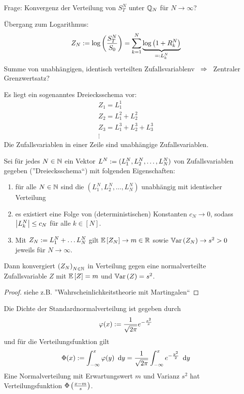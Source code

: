 Frage: Konvergenz der Verteilung von $S_T^N$ unter $\Q_N$ für $N \to \infty$?

Übergang zum Logarithmus:
\begin{equation*}
Z_N \defeq \log\brackets{\frac{S_T^N}{S_0}} = \sum_{k = 1}^N \underbrace{\log\brackets{1 + R_k^N}}_{\defqe L_k^N}
\end{equation*}
Summe von unabhängigen, identisch verteilten Zufallsvariablenv $\follows$ Zentraler Grenzwertsatz?

Es liegt ein sogenanntes Dreiecksschema vor:
\begin{align*}
Z_1 = L_1^1 \\
Z_2 = L_1^2 + L_2^2 \\
Z_3 = L_1^3 + L_2^3 + L_3^3 \\
\vdots
\end{align*}
Die Zufallsvariablen in einer Zeile sind unabhängige Zufallsvariablen.

\begin{theorem} %
	\label{theorem: 3.1}
	Sei für jedes $N \in \N$ ein Vektor $L^N \defeq (L_1^N, L_2^N, \dots, L_N^N)$ von Zufallsvariablen gegeben (''Dreiecksschema``) mit folgenden Eigenschaften:
	\begin{enumerate}[label = (\alph*), nolistsep]
		\item für alle $N \in \N$ sind die $(L_1^N, L_2^N, \dots, L_N^N)$ unabhängig mit identischer Verteilung
		\item es existiert eine Folge von (deterministischen) Konstanten $c_N \to 0$, sodass $\abs{L_k^N} \le c_N$ für alle $k \in [N]$.
		\item Mit $Z_N \defeq L_1^N + \dots L_N^N$ gilt $\EW[Z_N] \to m \in \R$ sowie $\Var[Z_N] \to s^2 > 0$ jeweils für $N \to \infty$.
	\end{enumerate}
	Dann konvergiert $\folge{Z_N}{N \in \N}$ in Verteilung gegen eine normalverteilte Zufallsvariable $Z$ mit $\EW[Z] = m$ und $\Var[Z] = s^2$. 
\end{theorem}
\begin{proof}
	siehe z.B. ''Wahrscheinlichkeitstheorie mit Martingalen``
\end{proof}

\begin{*bemerkung_inline}
	Die Dichte der Standardnormalverteilung ist gegeben durch
	\begin{equation*}
	\phi(x) \defeq \frac{1}{\sqrt{2 \pi}} e^{-\frac{x^2}{x}}
	\end{equation*}
	und für die Verteilungsfunktion gilt
	\begin{equation*}
	\Phi(x) \defeq \int_{-\infty}^x \phi(y) \diffskip{y} = \frac{1}{\sqrt{2 \pi}} \int_{-\infty}^x e^{-\frac{y^2}{2}} \diffskip{y}
	\end{equation*}
	Eine Normalverteilung mit Erwartungswert $m$ und Varianz $s^2$ hat Verteilungsfunktion $\Phi\brackets{\frac{x-m}{s}}$.
\end{*bemerkung_inline}

